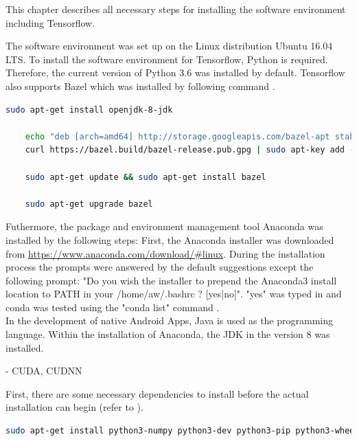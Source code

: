 This chapter describes all necessary steps for installing the software environment including Tensorflow.

The software environment was set up on the Linux distribution Ubuntu 16.04 LTS. To install the software environment for Tensorflow, Python is required. Therefore, the current version of Python 3.6 was installed by default. Tensorflow also supports Bazel which was installed by following command \citep{Bazel}.

\begin{lstlisting}[caption=Bazel Installation, label=list:bazel, language=bash]
	sudo apt-get install openjdk-8-jdk
	
	echo "deb [arch=amd64] http://storage.googleapis.com/bazel-apt stable jdk1.8" | sudo tee /etc/apt/				sources.list.d/bazel.list
	curl https://bazel.build/bazel-release.pub.gpg | sudo apt-key add -
	
	sudo apt-get update && sudo apt-get install bazel
	
	sudo apt-get upgrade bazel
\end{lstlisting}	

Futhermore, the package and environment management tool Anaconda was installed by the following steps:
First, the Anaconda installer was downloaded from \url{https://www.anaconda.com/download/#linux}. During the installation process the prompts were answered by the default suggestions except the following prompt: "Do you wish the installer to prepend the Anaconda3 install location to PATH in your /home/aw/.bashrc ? [yes|no]". "yes" was typed in and conda was tested using the "conda list" command \citep{Anaconda}. \\

In the development of native Android Apps, Java is used as the programming language. Within the installation of Anaconda, the JDK in the version 8 was installed.

 	- CUDA, CUDNN
 	
First, there are some necessary dependencies to install before the actual installation can begin (refer to ).
\begin{lstlisting}[caption=Installing the dependecies for Tensorflow based on Python 3.n, label=list:python_dependencies, language=bash]
	sudo apt-get install python3-numpy python3-dev python3-pip python3-wheel
\end{lstlisting}

